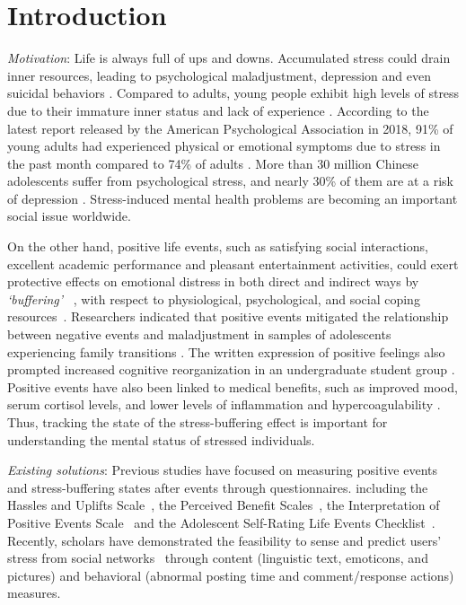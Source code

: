 \documentclass[5p,times,numbers,authoryear]{elsarticle}
\begin{document}
\section{Introduction}
\emph{Motivation}: Life is always full of ups and downs.
Accumulated stress could drain inner resources,
leading to psychological maladjustment, depression and even suicidal behaviors \citep{Nock2008Suicide}.
Compared to adults, 
{young people exhibit high levels of stress}
due to their immature inner status and lack of experience \citep{older}.
According to the latest report released by the American Psychological Association in 2018,
91\% of young adults had experienced physical or emotional symptoms due to stress in the past month compared to 74\% of adults \citep{APA2018}.
More than 30 million Chinese adolescents suffer from psychological stress,
and nearly 30\% of them are at a risk of depression \citep{ChinaTeen2019}.
Stress-induced mental health problems are becoming an important social issue worldwide.

On the other hand, positive life events, such as satisfying social interactions,
excellent academic performance and pleasant entertainment activities,
could exert protective effects on emotional distress in both direct and indirect ways by \emph{`buffering'} ~\citep{Shahar2002Positive, Cohen2010Positive},
with respect to physiological, psychological, and social coping resources~\citep{Cohen1984Positive,Needles1990Positive}.
Researchers indicated that positive events mitigated the relationship between negative events and maladjustment in samples of adolescents experiencing family transitions \citep{Doyle2003Positive}.
The written expression of positive feelings also prompted increased cognitive reorganization in an undergraduate student group \citep{Coolidge2009A}.
Positive events have also been linked to medical benefits, such as improved mood, serum cortisol levels, and lower levels of inflammation and hypercoagulability \citep{Caputo1998Influence,Jain2010Effects}.
Thus, tracking the state of the stress-buffering effect is important for understanding the mental status of stressed individuals.

\emph{Existing solutions}:
Previous studies have focused on measuring positive events and stress-buffering states after events through questionnaires.
including the Hassles and Uplifts Scale~\citep{Kanner1981Comparison}, the
Perceived Benefit Scales~\citep{Mcmillen1998The}, the
Interpretation of Positive Events Scale~\citep{Alden2008Social}
and the Adolescent Self-Rating Life Events Checklist~\citep{Jun2008Influence}.
Recently, scholars have demonstrated the feasibility to sense and predict users' stress from social networks~\citep{XueUbicomp13,Xue2014Detecting,Lin2014User,Li2015When,Li2015Predicting,Li2015Using,
Li2017Analyzing,Li2017Exploring}
through content (linguistic text, emoticons, and pictures)
and behavioral (abnormal posting time and comment/response actions) measures.
\end{document}

